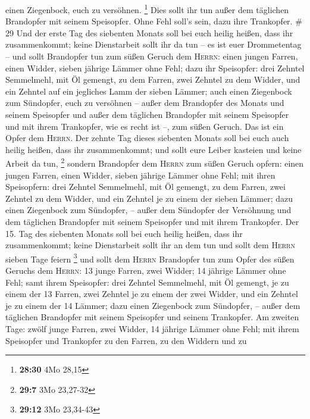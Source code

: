 einen Ziegenbock, euch zu versöhnen. \footnote{\textbf{28:30} 4Mo 28,15}
 Dies sollt ihr tun außer dem täglichen Brandopfer mit
seinem Speisopfer. Ohne Fehl soll's sein, dazu ihre Trankopfer. \# 29
 Und der erste Tag des siebenten Monats soll bei euch
heilig heißen, dass ihr zusammenkommt; keine Dienstarbeit sollt ihr da
tun -- es ist euer Drommetentag --  und sollt Brandopfer
tun zum süßen Geruch dem \textsc{Herrn}: einen jungen Farren, einen
Widder, sieben jährige Lämmer ohne Fehl;  dazu ihr
Speisopfer: drei Zehntel Semmelmehl, mit Öl gemengt, zu dem Farren, zwei
Zehntel zu dem Widder,  und ein Zehntel auf ein jegliches
Lamm der sieben Lämmer;  auch einen Ziegenbock zum
Sündopfer, euch zu versöhnen --  außer dem Brandopfer des
Monats und seinem Speisopfer und außer dem täglichen Brandopfer mit
seinem Speisopfer und mit ihrem Trankopfer, wie es recht ist --, zum
süßen Geruch. Das ist ein Opfer dem \textsc{Herrn}.  Der
zehnte Tag dieses siebenten Monats soll bei euch auch heilig heißen,
dass ihr zusammenkommt; und sollt eure Leiber kasteien und keine Arbeit
da tun, \footnote{\textbf{29:7} 3Mo 23,27-32}  sondern
Brandopfer dem \textsc{Herrn} zum süßen Geruch opfern: einen jungen
Farren, einen Widder, sieben jährige Lämmer ohne Fehl; 
mit ihren Speisopfern: drei Zehntel Semmelmehl, mit Öl gemengt, zu dem
Farren, zwei Zehntel zu dem Widder,  und ein Zehntel je
zu einem der sieben Lämmer;  dazu einen Ziegenbock zum
Sündopfer, -- außer dem Sündopfer der Versöhnung und dem täglichen
Brandopfer mit seinem Speisopfer und mit ihrem Trankopfer.
 Der 15. Tag des siebenten Monats soll bei euch heilig
heißen, dass ihr zusammenkommt; keine Dienstarbeit sollt ihr an dem tun
und sollt dem \textsc{Herrn} sieben Tage feiern \footnote{\textbf{29:12}
  3Mo 23,34-43}  und sollt dem \textsc{Herrn} Brandopfer
tun zum Opfer des süßen Geruchs dem \textsc{Herrn}: 13 junge Farren,
zwei Widder; 14 jährige Lämmer ohne Fehl;  samt ihrem
Speisopfer: drei Zehntel Semmelmehl, mit Öl gemengt, je zu einem der 13
Farren, zwei Zehntel je zu einem der zwei Widder,  und
ein Zehntel je zu einem der 14 Lämmer;  dazu einen
Ziegenbock zum Sündopfer, -- außer dem täglichen Brandopfer mit seinem
Speisopfer und seinem Trankopfer.  Am zweiten Tage: zwölf
junge Farren, zwei Widder, 14 jährige Lämmer ohne Fehl; 
mit ihrem Speisopfer und Trankopfer zu den Farren, zu den Widdern und zu
